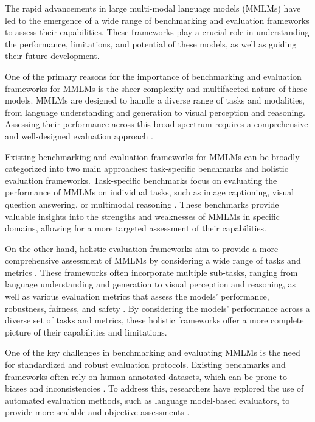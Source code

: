 \documentclass[11pt]{article}
\begin{document}
The rapid advancements in large multi-modal language models (MMLMs) have led to the emergence of a wide range of benchmarking and evaluation frameworks to assess their capabilities. These frameworks play a crucial role in understanding the performance, limitations, and potential of these models, as well as guiding their future development.

One of the primary reasons for the importance of benchmarking and evaluation frameworks for MMLMs is the sheer complexity and multifaceted nature of these models. MMLMs are designed to handle a diverse range of tasks and modalities, from language understanding and generation to visual perception and reasoning. Assessing their performance across this broad spectrum requires a comprehensive and well-designed evaluation approach \cite{ref51,ref54}.

Existing benchmarking and evaluation frameworks for MMLMs can be broadly categorized into two main approaches: task-specific benchmarks and holistic evaluation frameworks. Task-specific benchmarks focus on evaluating the performance of MMLMs on individual tasks, such as image captioning, visual question answering, or multimodal reasoning \cite{ref46,ref55}. These benchmarks provide valuable insights into the strengths and weaknesses of MMLMs in specific domains, allowing for a more targeted assessment of their capabilities.

On the other hand, holistic evaluation frameworks aim to provide a more comprehensive assessment of MMLMs by considering a wide range of tasks and metrics \cite{ref56,ref56}. These frameworks often incorporate multiple sub-tasks, ranging from language understanding and generation to visual perception and reasoning, as well as various evaluation metrics that assess the models' performance, robustness, fairness, and safety \cite{ref57}. By considering the models' performance across a diverse set of tasks and metrics, these holistic frameworks offer a more complete picture of their capabilities and limitations.

One of the key challenges in benchmarking and evaluating MMLMs is the need for standardized and robust evaluation protocols. Existing benchmarks and frameworks often rely on human-annotated datasets, which can be prone to biases and inconsistencies \cite{ref58,ref59}. To address this, researchers have explored the use of automated evaluation methods, such as language model-based evaluators, to provide more scalable and objective assessments \cite{ref60,ref61}.
\end{document}
